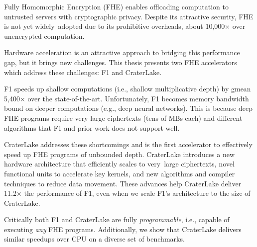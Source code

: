 Fully Homomorphic Encryption (FHE) enables offloading computation to untrusted
servers with cryptographic privacy. Despite its attractive security, FHE is not
yet widely~adopted due to its prohibitive overheads, about 10,000$\times$ over
unencrypted computation.

Hardware acceleration is an attractive approach to bridging this performance
gap, but it brings new challenges. This thesis presents two FHE accelerators
which address these challenges: F1 and CraterLake.

F1 speeds up shallow computations (i.e., shallow multiplicative depth) by gmean
5,400$\times$ over the state-of-the-art. Unfortunately, F1 becomes memory
bandwidth bound on deeper computations (e.g., deep neural networks).
This is because deep FHE programs require very large ciphertexts (tens of MBs each)
and different algorithms that F1 and prior work does not support well.

CraterLake addresses these shortcomings and is the first accelerator to
effectively speed up FHE programs of unbounded depth.  CraterLake introduces a
new hardware architecture that efficiently scales to very~large ciphertexts,
novel functional units to accelerate key kernels, and new algorithms and
compiler techniques to reduce data movement. These advances help CraterLake
deliver 11.2$\times$ the performance of F1, even when we scale F1's
architecture to the size of CraterLake.

Critically both F1 and CraterLake are fully \emph{programmable}, i.e., capable
of executing \emph{any} FHE programs. Additionally, we show that CraterLake
delivers similar speedups over CPU on a diverse set of benchmarks.
